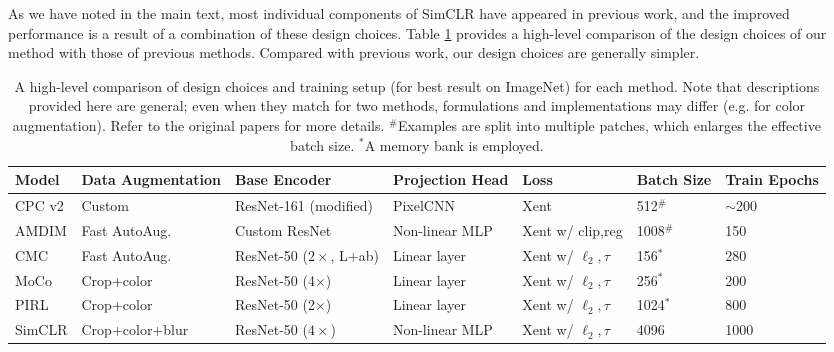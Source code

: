 \documentclass{article}
\begin{document}
As we have noted in the main text, most individual components of SimCLR have appeared in previous work, and the improved performance is a result of a combination of these design choices. Table \ref{tab:comp_design} provides a high-level comparison of the design choices of our method with those of previous methods.
Compared with previous work, our design choices are generally simpler.

\begin{table}[h!]
\small
\centering
\begin{tabular}{lllllll}
\toprule
Model & Data Augmentation & Base Encoder & Projection Head & Loss & Batch Size & Train Epochs  \\\midrule 
CPC v2 & Custom & ResNet-161 (modified) & PixelCNN & Xent & 512$^\#$ & $\sim$200 \\
AMDIM & Fast AutoAug. & Custom ResNet  & Non-linear MLP & Xent w/ clip,reg & 1008$^\#$ & 150 \\
CMC & Fast AutoAug.  & ResNet-50 ($2\times$, L+ab)  & Linear layer & Xent w/ $\ell_2,\tau$ & 156$^*$ & 280 \\
MoCo & Crop+color  & ResNet-50 (4$\times$)  & Linear layer & Xent w/ $\ell_2,\tau$ & 256$^*$ & 200 \\
PIRL &  Crop+color & ResNet-50 (2$\times$) & Linear layer & Xent w/ $\ell_2,\tau$ & 1024$^*$ & 800 \\
SimCLR & Crop+color+blur  & ResNet-50 ($4\times$)  & Non-linear MLP  & Xent w/ $\ell_2,\tau$ & 4096 & 1000 \\
\bottomrule
\end{tabular}
\caption{\label{tab:comp_design} A high-level comparison of design choices and training setup (for best result on ImageNet) for each method. Note that descriptions provided here are general; even when they match for two methods, formulations and implementations may differ (e.g. for color augmentation). Refer to the original papers for more details. $^\#$Examples are split into multiple patches, which enlarges the effective batch size. $^*$A memory bank is employed.}
\end{table}
\end{document}
